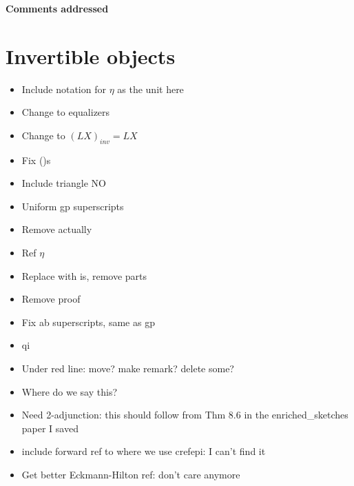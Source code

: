 \documentclass{amsart}
\begin{document}
\begin{center}
\begin{Large}
\textbf{Comments addressed}
\end{Large}
\end{center}
\vskip1cm


\section{ Invertible objects}
\begin{itemize}
\item Include notation for $\eta$ as the unit here
\item Change to equalizers
\item Change to $(LX)_{inv} = LX$
\item Fix ()s
\item Include triangle NO
\item Uniform gp superscripts
\item Remove actually
\item Ref $\eta$
\item Replace with is, remove parts
\item Remove proof
\item Fix ab superscripts, same as gp
\item qi
\item Under red line: move? make remark? delete some?
\item Where do we say this?
\item Need 2-adjunction: this should follow from Thm 8.6 in the enriched\_sketches paper I saved
\item include forward ref to where we use cref{epi}: I can't find it
\item Get better Eckmann-Hilton ref: don't care anymore
\end{itemize}
\end{document}

